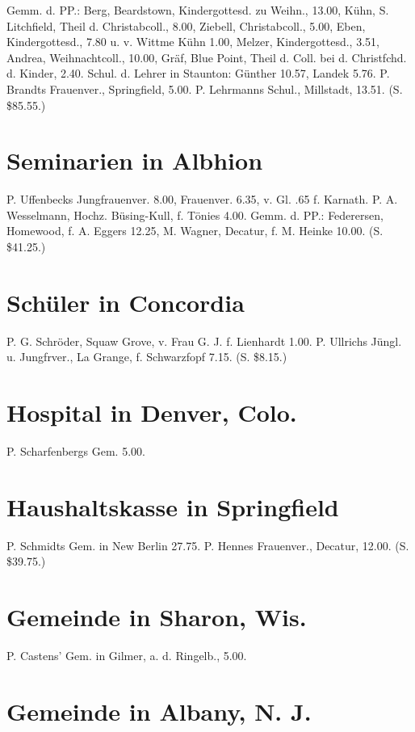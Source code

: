 Gemm. d. PP.: Berg, Beardstown, Kindergottesd. zu Weihn., 13.00, Kühn, S. Litchfield, Theil d. Christabcoll., 8.00, Ziebell, Christabcoll., 5.00, Eben, Kindergottesd., 7.80 u. v. Wittme Kühn 1.00, Melzer, Kindergottesd., 3.51, Andrea, Weihnachtcoll., 10.00, Gräf, Blue Point, Theil d. Coll. bei d. Christfchd. d. Kinder, 2.40. Schul. d. Lehrer in Staunton: Günther 10.57, Landek 5.76. P. Brandts Frauenver., Springfield, 5.00. P. Lehrmanns Schul., Millstadt, 13.51. (S. \$85.55.)

\section{Seminarien in Albhion}

P. Uffenbecks Jungfrauenver. 8.00, Frauenver. 6.35, v. Gl. .65 f. Karnath. P. A. Wesselmann, Hochz. Büsing-Kull, f. Tönies 4.00. Gemm. d. PP.: Federersen, Homewood, f. A. Eggers 12.25, M. Wagner, Decatur, f. M. Heinke 10.00. (S. \$41.25.)

\section{Schüler in Concordia}

P. G. Schröder, Squaw Grove, v. Frau G. J.
f. Lienhardt 1.00. P. Ullrichs Jüngl. u. Jungfrver., La Grange, f. Schwarzfopf 7.15. (S. \$8.15.)

\section{Hospital in Denver, Colo.}

P. Scharfenbergs Gem. 5.00.

\section{Haushaltskasse in Springfield}

P. Schmidts Gem. in New Berlin 27.75. P. Hennes Frauenver., Decatur, 12.00. (S. \$39.75.)

\section{Gemeinde in Sharon, Wis.}

P. Castens’ Gem. in Gilmer, a. d. Ringelb., 5.00.

\section{Gemeinde in Albany, N. J.}

